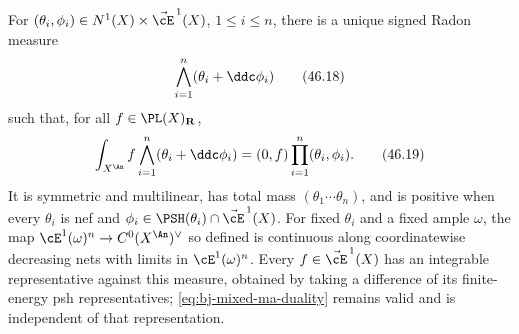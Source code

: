 \begin{theorem}\label{thm:bj-mixed-ma}
For $(\theta_i,\phi_i)\in
N^1(X)\times\vec{\cE}^{\,1}(X)$, $1\leq i\leq n$, there is a
unique signed Radon measure
\[
               \bigwedge_{i=1}^n(\theta_i+\ddc\phi_i)
\tag{46.18}\label{eq:bj-mixed-ma}
\]
such that, for all $f\in\PL(X)_{\mathbf R}$,
\[
 \int_{X^{\An}}f\bigwedge_{i=1}^n(\theta_i+\ddc\phi_i)
  =(0,f)\prod_{i=1}^n(\theta_i,\phi_i).
\tag{46.19}\label{eq:bj-mixed-ma-duality}
\]
It is symmetric and multilinear, has total mass
$(\theta_1\cdots\theta_n)$, and is positive when every $\theta_i$ is
nef and $\phi_i\in\PSH(\theta_i)\cap\vec{\cE}^{\,1}(X)$.
For fixed $\theta_i$ and a fixed ample $\omega$, the map
$\cE^1(\omega)^n\to C^0(X^{\An})^\vee$ so defined is continuous along
coordinatewise decreasing nets with limits in $\cE^1(\omega)^n$.
Every $f\in\vec{\cE}^{\,1}(X)$ has an integrable representative against
this measure, obtained by taking a difference of its finite-energy psh
representatives; \eqref{eq:bj-mixed-ma-duality} remains valid and is
independent of that representation.
\end{theorem}

